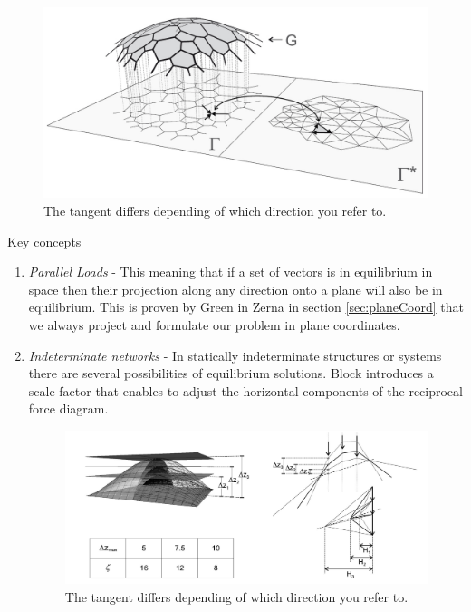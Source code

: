 \begin{figure}[H]
\centering
\includegraphics[width=1.0\linewidth ]{figure/Theory/TNA.jpg}
\caption{The tangent differs depending of which direction you refer to. }
\end{figure}

Key concepts

\begin{enumerate}
\item \textit{Parallel Loads} - This meaning that if a set of vectors is in equilibrium in space then their projection along any direction onto a plane will also be in equilibrium. This is proven by Green in Zerna in section \ref{sec:planeCoord} that we always project and formulate our problem in plane coordinates.
\item \textit{Indeterminate networks} - In statically indeterminate structures or systems there are several possibilities of equilibrium solutions. Block introduces a scale factor that enables to adjust the horizontal components of the reciprocal force diagram.     

\begin{figure}[H]
\centering
\includegraphics[width=0.9\linewidth ]{figure/Theory/TNAKey2.JPG}
\caption{The tangent differs depending of which direction you refer to. }
\end{figure}

\end{enumerate}


